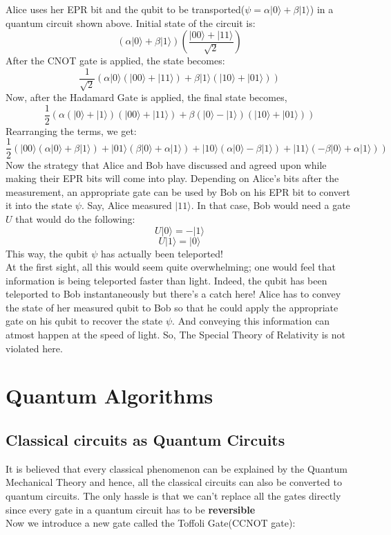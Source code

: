 \documentclass{article}
\begin{document}
Alice uses her EPR bit and the qubit to be transported($\psi = \alpha |0 \rangle + \beta |1 \rangle$) in a quantum circuit shown above. Initial state of the circuit is:
$$\left( \alpha |0 \rangle + \beta |1 \rangle \right) \left( \frac{|00 \rangle + |11 \rangle}{\sqrt{2}} \right)$$ After the CNOT gate is applied, the state becomes:
$$\frac{1}{\sqrt{2}} \left( \alpha |0 \rangle \left( |00 \rangle + |11 \rangle \right) + \beta |1 \rangle \left( |10 \rangle + |01 \rangle \right) \right)$$ Now, after the Hadamard Gate is applied, the final state becomes, 
$$\frac{1}{2} \left( \alpha \left( |0 \rangle + |1 \rangle \right) \left( |00 \rangle + |11 \rangle \right) + \beta \left( |0 \rangle - |1 \rangle \right) \left( |10 \rangle + |01 \rangle \right) \right)$$
Rearranging the terms, we get:
$$\frac{1}{2} \left( |00 \rangle \left( \alpha |0 \rangle + \beta |1 \rangle \right) + |01 \rangle \left( \beta |0 \rangle + \alpha |1 \rangle \right) + |10 \rangle \left( \alpha |0 \rangle - \beta |1 \rangle \right) + |11 \rangle \left( -\beta |0 \rangle + \alpha |1 \rangle \right) \right)$$
Now the strategy that Alice and Bob have discussed and agreed upon while making their EPR bits will come into play. Depending on Alice's bits after the measurement, an appropriate gate can be used by Bob on his EPR bit to convert it into the state $\psi$. Say, Alice measured $|11 \rangle$. In that case, Bob would need a gate $U$ that would do the following:
$$U|0 \rangle = -|1 \rangle$$ $$U|1 \rangle = |0 \rangle$$ This way, the qubit $\psi$ has actually been teleported!\\[5pt]
At the first sight, all this would seem quite overwhelming; one would feel that information is being teleported faster than light. Indeed, the qubit has been teleported to Bob instantaneously but there's a catch here! Alice has to convey the state of her measured qubit to Bob so that he could apply the appropriate gate on his qubit to recover the state $\psi$. And conveying this information can atmost happen at the speed of light. So, The Special Theory of Relativity is not violated here.

\section{Quantum Algorithms}
\subsection{Classical circuits as Quantum Circuits}
It is believed that every classical phenomenon can be explained by the Quantum Mechanical Theory and hence, all the classical circuits can also be converted to quantum circuits. The only hassle is that we can't replace all the gates directly since every gate in a quantum circuit has to be \textbf{reversible}\\[3pt]
Now we introduce a new gate called the Toffoli Gate(CCNOT gate):
\end{document}
